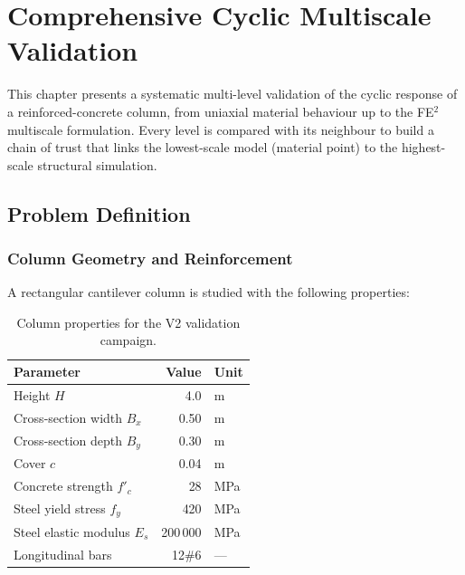 \chapter{Comprehensive Cyclic Multiscale Validation}
\label{ch:cyclic-multiscale-validation}

This chapter presents a systematic multi-level validation of the cyclic
response of a reinforced-concrete column, from uniaxial material
behaviour up to the FE$^2$ multiscale formulation.
Every level is compared with its neighbour to build a chain of trust
that links the lowest-scale model (material point) to the
highest-scale structural simulation.

\section{Problem Definition}
\label{sec:v2-problem}

\subsection{Column Geometry and Reinforcement}
\label{ssec:v2-geometry}

A rectangular cantilever column is studied with the following properties:

\begin{table}[htbp]
\centering
\caption{Column properties for the V2 validation campaign.}
\label{tab:v2-column}
\begin{tabular}{@{}lrl@{}}
\toprule
\textbf{Parameter}             & \textbf{Value} & \textbf{Unit} \\
\midrule
Height $H$                     & 4.0    & m     \\
Cross-section width $B_x$      & 0.50   & m     \\
Cross-section depth $B_y$      & 0.30   & m     \\
Cover $c$                      & 0.04   & m     \\
Concrete strength $f'_c$       & 28     & MPa   \\
Steel yield stress $f_y$       & 420    & MPa   \\
Steel elastic modulus $E_s$    & 200\,000 & MPa \\
Longitudinal bars              & 12\#6  & —     \\
\bottomrule
\end{tabular}
\end{table}

